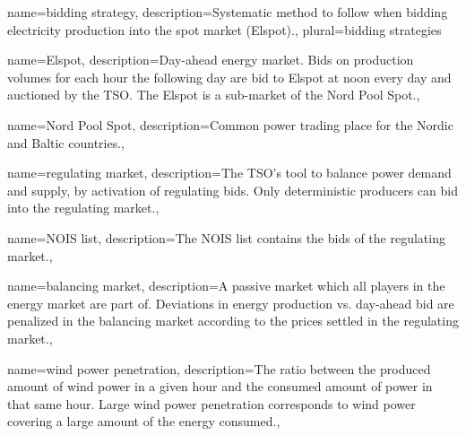 


{name=bidding strategy,
 description={Systematic method to follow when bidding electricity production into the spot market (Elspot).},
 plural={bidding strategies}
}

{name=Elspot,
description={Day-ahead energy market. Bids on production volumes for each hour the following day are bid to Elspot at noon every day and auctioned by the TSO. The Elspot is a sub-market of the Nord Pool Spot.},
}

{name=Nord Pool Spot,
description={Common power trading place for the Nordic and Baltic countries.},
}

{name=regulating market,
description={The TSO's tool to balance power demand and supply, by activation of regulating bids. Only deterministic producers can bid into the regulating market.},
}

{name=NOIS list,
description={The NOIS list contains the bids of the regulating market.},
}

{name=balancing market,
description={A passive market which all players in the energy market are part of. Deviations in energy production vs. day-ahead bid are penalized in the balancing market according to the prices settled in the regulating market.},
}

{name=wind power penetration,
description={The ratio between the produced amount of wind power in a given hour and the consumed amount of power in that same hour. Large wind power penetration corresponds to wind power covering a large amount of the energy consumed.},
}





